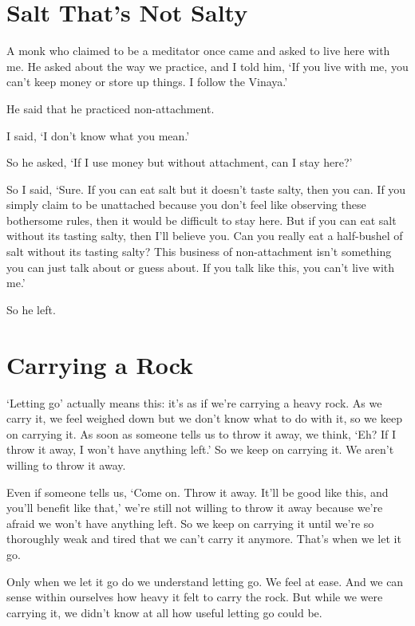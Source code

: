 \clearpage

\section{Salt That's Not Salty}

A monk who claimed to be a meditator once came and asked to live here with me. He asked about the way we practice, and I told him, `If you live with me, you can't keep money or store up things. I follow the Vinaya.'

He said that he practiced non-attachment. 

I said, `I don't know what you mean.'

So he asked, `If I use money but without attachment, can I stay here?'

So I said, `Sure. If you can eat salt but it doesn't taste salty, then you can. If you simply claim to be unattached because you don't feel like observing these bothersome rules, then it would be difficult to stay here. But if you can eat salt without its tasting salty, then I'll believe you. Can you really eat a half-bushel of salt without its tasting salty? This business of non-attachment isn't something you can just talk about or guess about. If you talk like this, you can't live with me.'

So he left.

\clearpage

\section{Carrying a Rock}

`Letting go' actually means this: it's as if we're carrying a heavy rock. As we carry it, we feel weighed down but we don't know what to do with it, so we keep on carrying it. As soon as someone tells us to throw it away, we think, `Eh? If I throw it away, I won't have anything left.' So we keep on carrying it. We aren't willing to throw it away.

Even if someone tells us, `Come on. Throw it away. It'll be good like this, and you'll benefit like that,' we're still not willing to throw it away because we're afraid we won't have anything left. So we keep on carrying it until we're so thoroughly weak and tired that we can't carry it anymore. That's when we let it go.

Only when we let it go do we understand letting go. We feel at ease. And we can sense within ourselves how heavy it felt to carry the rock. But while we were carrying it, we didn't know at all how useful letting go could be.

